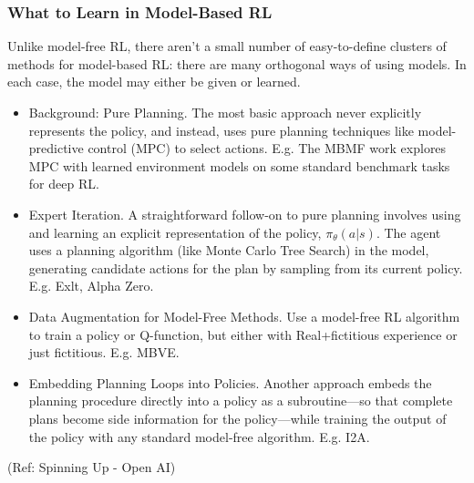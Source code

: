 \begin{frame}[fragile]\frametitle{What to Learn in Model-Based RL}

Unlike model-free RL, there aren’t a small number of easy-to-define clusters of methods for model-based RL: there are many orthogonal ways of using models.  In each case, the model may either be given or learned.

\begin{itemize}
\item Background: Pure Planning. The most basic approach never explicitly represents the policy, and instead, uses pure planning techniques like model-predictive control (MPC) to select actions. E.g. The MBMF work explores MPC with learned environment models on some standard benchmark tasks for deep RL.
\item Expert Iteration. A straightforward follow-on to pure planning involves using and learning an explicit representation of the policy, $\pi_{\theta}(a|s)$. The agent uses a planning algorithm (like Monte Carlo Tree Search) in the model, generating candidate actions for the plan by sampling from its current policy. E.g. Exlt, Alpha Zero.
\item Data Augmentation for Model-Free Methods. Use a model-free RL algorithm to train a policy or Q-function, but either with Real+fictitious experience or just fictitious. E.g. MBVE.
\item Embedding Planning Loops into Policies. Another approach embeds the planning procedure directly into a policy as a subroutine—so that complete plans become side information for the policy—while training the output of the policy with any standard model-free algorithm. E.g. I2A.
\end{itemize}

{\tiny (Ref: Spinning Up - Open AI)}
\end{frame}

